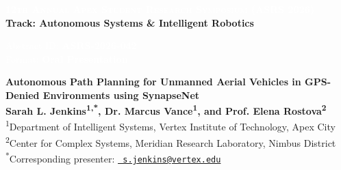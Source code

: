 \documentclass[10pt]{article}
\begin{document}
\pagestyle{empty}

\noindent
\begin{tcolorbox}[
    colback=primary,
    colframe=primary,
    arc=4pt,
    left=10pt,
    right=10pt,
    top=5pt,
    bottom=5pt,
    boxrule=0pt
]
    \begin{minipage}[c]{0.7\textwidth}
        \textcolor{white}{\fontsize{9.5}{11.5}\sffamily\bfseries\scshape 12th Annual Apex Student Research Symposium (ASRS 2026)} \\
        \textcolor{accent}{\fontsize{8}{10}\sffamily\bfseries Track: Autonomous Systems \& Intelligent Robotics}
    \end{minipage}\hfill
    \begin{minipage}[c]{0.25\textwidth}
        \flushright
        \textcolor{white}{\fontsize{8}{10}\sffamily Abstract ID: \textbf{ASRS-2026-042}} \\
        \textcolor{white}{\fontsize{8}{10}\sffamily Format: \textbf{Oral Presentation}}
    \end{minipage}
\end{tcolorbox}

\vspace{0.2cm}

\noindent
\begin{tcolorbox}[
    colback=white,
    colframe=secondary,
    leftrule=4pt,
    rightrule=0pt,
    toprule=0pt,
    bottomrule=0pt,
    arc=0pt,
    outer arc=0pt,
    left=10pt,
    right=0pt,
    top=0pt,
    bottom=0pt,
    boxsep=0pt
]
    {\fontsize{15}{18}\sffamily\bfseries\color{primary} Autonomous Path Planning for Unmanned Aerial Vehicles in GPS-Denied Environments using SynapseNet}\\[0.12cm]
    
    {\fontsize{10}{12}\sffamily\bfseries Sarah L. Jenkins\textsuperscript{1,*}, Dr. Marcus Vance\textsuperscript{1}, and Prof. Elena Rostova\textsuperscript{2}}\\[0.08cm]
    
    {\fontsize{8}{10}\sffamily\color{darkneutral} 
    \textsuperscript{1}Department of Intelligent Systems, Vertex Institute of Technology, Apex City \\
    \textsuperscript{2}Center for Complex Systems, Meridian Research Laboratory, Nimbus District\\[0.05cm]
    \textsuperscript{*}Corresponding presenter: \href{mailto:s.jenkins@vertex.edu}{\texttt{\faEnvelope\ s.jenkins@vertex.edu}}
    }
\end{tcolorbox}
\end{document}
